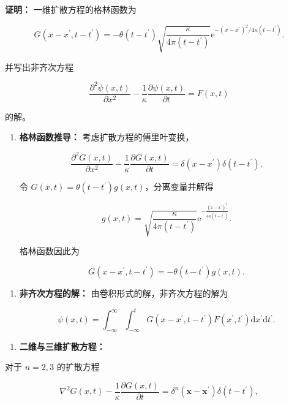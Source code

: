 \textbf{证明：} 一维扩散方程的格林函数为

\[G\left( x - x^{\prime},t - t^{\prime} \right) = - \theta\left( t - t^{\prime} \right)\sqrt{\frac{\kappa}{4\pi\left( t - t^{\prime} \right)}}\mathrm{e}^{- \left( x - x^{\prime} \right)^{2}/4\kappa\left( t - t^{\prime} \right)}.\]

并写出非齐次方程

\[\frac{\partial^{2}\psi(x,t)}{\partial x^{2}} - \frac{1}{\kappa}\frac{\partial\psi(x,t)}{\partial t} = F(x,t)\]

的解。

\begin{enumerate}
\def\labelenumi{\arabic{enumi}.}
\setcounter{enumi}{2}
\item
  \textbf{格林函数推导：} 考虑扩散方程的傅里叶变换，

  \[\frac{\partial^{2}G(x,t)}{\partial x^{2}} - \frac{1}{\kappa}\frac{\partial G(x,t)}{\partial t} = \delta\left( x - x^{\prime} \right)\delta\left( t - t^{\prime} \right).\]

  令
  \(G(x,t) = \theta\left( t - t^{\prime} \right)g(x,t)\)，分离变量并解得

  \[g(x,t) = \sqrt{\frac{\kappa}{4\pi\left( t - t^{\prime} \right)}}\mathrm{e}^{- \frac{\left( x - x^{\prime} \right)^{2}}{4\kappa\left( t - t^{\prime} \right)}}.\]

  格林函数因此为

  \[G\left( x - x^{\prime},t - t^{\prime} \right) = - \theta\left( t - t^{\prime} \right)g(x,t).\]
\end{enumerate}

\begin{enumerate}
\def\labelenumi{\arabic{enumi}.}
\setcounter{enumi}{1}
\item
  \textbf{非齐次方程的解：} 由卷积形式的解，非齐次方程的解为

  \[\psi(x,t) = \int_{- \infty}^{\infty}\int_{- \infty}^{t}G\left( x - x^{\prime},t - t^{\prime} \right)F\left( x^{\prime},t^{\prime} \right)\mathrm{d}x^{\prime}\mathrm{d}t^{\prime}.\]
\end{enumerate}

\begin{enumerate}
\def\labelenumi{\arabic{enumi}.}
\setcounter{enumi}{2}
\item
  \textbf{二维与三维扩散方程：}
\end{enumerate}

对于 \(n = 2,3\) 的扩散方程

\[\nabla^{2}G(x,t) - \frac{1}{\kappa}\frac{\partial G(x,t)}{\partial t} = \delta^{n}\left( \mathbf{x} - \mathbf{x}^{\prime} \right)\delta\left( t - t^{\prime} \right),\]

